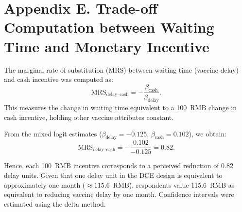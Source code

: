 
\section*{Appendix E. Trade-off Computation between Waiting Time and Monetary Incentive}

The marginal rate of substitution (MRS) between waiting time (vaccine delay) and cash incentive
was computed as:
\begin{equation}
\text{MRS}_{\text{delay--cash}} = -\frac{\beta_{\text{cash}}}{\beta_{\text{delay}}}.
\end{equation}
This measures the change in waiting time equivalent to a 100~RMB change in cash incentive,
holding other vaccine attributes constant.

From the mixed logit estimates ($\beta_{\text{delay}}=-0.125$, $\beta_{\text{cash}}=0.102$),
we obtain:
\begin{equation}
\text{MRS}_{\text{delay--cash}} = -\frac{0.102}{-0.125} = 0.82.
\end{equation}

Hence, each 100~RMB incentive corresponds to a perceived reduction of 0.82 delay units.
Given that one delay unit in the DCE design is equivalent to approximately one month
($\approx115.6$~RMB), respondents value 115.6~RMB as equivalent to reducing vaccine delay by one month.
Confidence intervals were estimated using the delta method.
